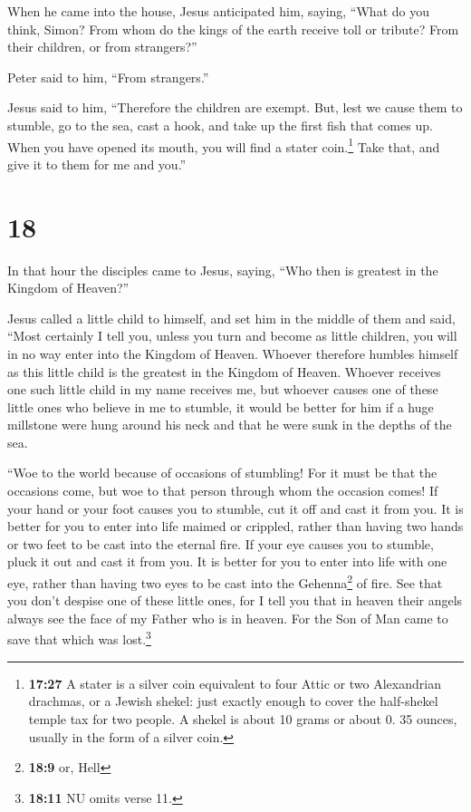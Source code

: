 When he came into the house, Jesus anticipated him, saying, ``What do
you think, Simon? From whom do the kings of the earth receive toll or
tribute? From their children, or from strangers?''

 Peter said to him, ``From strangers.''

Jesus said to him, ``Therefore the children are exempt. 
But, lest we cause them to stumble, go to the sea, cast a hook, and take
up the first fish that comes up. When you have opened its mouth, you
will find a stater coin.\footnote{\textbf{17:27} A stater is a silver
  coin equivalent to four Attic or two Alexandrian drachmas, or a Jewish
  shekel: just exactly enough to cover the half-shekel temple tax for
  two people. A shekel is about 10 grams or about 0. 35 ounces, usually
  in the form of a silver coin.} Take that, and give it to them for me
and you.''

\hypertarget{section-17}{%
\section{18}\label{section-17}}

 In that hour the disciples came to Jesus, saying, ``Who
then is greatest in the Kingdom of Heaven?''

 Jesus called a little child to himself, and set him in
the middle of them  and said, ``Most certainly I tell you,
unless you turn and become as little children, you will in no way enter
into the Kingdom of Heaven.  Whoever therefore humbles
himself as this little child is the greatest in the Kingdom of Heaven.
 Whoever receives one such little child in my name
receives me,  but whoever causes one of these little ones
who believe in me to stumble, it would be better for him if a huge
millstone were hung around his neck and that he were sunk in the depths
of the sea.

 ``Woe to the world because of occasions of stumbling! For
it must be that the occasions come, but woe to that person through whom
the occasion comes!  If your hand or your foot causes you
to stumble, cut it off and cast it from you. It is better for you to
enter into life maimed or crippled, rather than having two hands or two
feet to be cast into the eternal fire.  If your eye causes
you to stumble, pluck it out and cast it from you. It is better for you
to enter into life with one eye, rather than having two eyes to be cast
into the Gehenna\footnote{\textbf{18:9} or, Hell} of fire.
 See that you don't despise one of these little ones, for
I tell you that in heaven their angels always see the face of my Father
who is in heaven.  For the Son of Man came to save that
which was lost.\footnote{\textbf{18:11} NU omits verse 11.}

